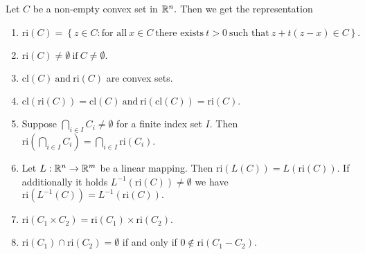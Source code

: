 \begin{proposition}
  Let $C$ be a non-empty convex set in $\mathbb{R}^n.$ Then we get the representation
\begin{enumerate}[label={(\roman*)}]
  \item
    $
    \mathrm{ri}(C)
    =
    \left\{ 
      z \in C
      \colon
      \text{for all}\ 
      x \in C \ 
      \text{there exists}\ 
      t > 0 \ 
      \text{such that}\ 
      z + t (z-x)
      \in C
    \right\}.
    $
  \item
    $
      \mathrm{ri}(C)
      \neq
      \emptyset
      \ 
      \text{if}\ 
      C\neq \emptyset
      .
    $
  \item
    $
      \mathrm{cl}(C)
      \ 
      \text{and}\ 
      \mathrm{ri}(C)
    $
    are convex sets.
  \item
    $
      \mathrm{cl}(\mathrm{ri}(C))
      =
      \mathrm{cl}(C)
      \ 
      \text{and}
      \  
      \mathrm{ri}(\mathrm{cl}(C))
      =
      \mathrm{ri}(C)
      .
    $
  \item
    Suppose
    $
      \bigcap_{i\in I} C_i
      \neq
      \emptyset
    $
    for a finite index set $I.$
    Then
    $
      \mathrm{ri}
      \left( 
        \bigcap_{i\in I} C_i
      \right)
      =
      \bigcap_{i\in I}  
      \mathrm{ri}(C_i)
      .
    $
    \item
      Let 
      $
        L:\mathbb{R}^n \to \mathbb{R}^m
      $
      be a linear mapping. Then
      $
        \mathrm{ri}(L(C))
        =
        L(\mathrm{ri}(C))
        .
      $
      If additionally it holds
      $
        L^{-1}(\mathrm{ri}(C))
        \neq
        \emptyset
      $
      we have
      $
      \mathrm{ri}(L^{-1}(C))
        =
        L^{-1}(\mathrm{ri}(C))
        .
      $
      \item
        $
          \mathrm{ri}(C_1\times C_2)
          = 
          \mathrm{ri}(C_1)
          \times
          \mathrm{ri}(C_2).
        $
      \item
        $
          \mathrm{ri}(C_1)
          \cap
          \mathrm{ri}(C_2)
          =
          \emptyset
        $
        if and only if
        $
          0 \notin
          \mathrm{ri}
          (C_1 - C_2)
          .
        $
\end{enumerate}

\end{proposition}


